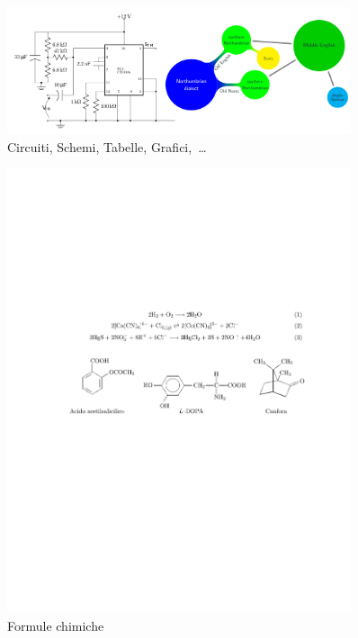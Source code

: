 \begin{figure}[!h]\centering
  \includegraphics[width=0.9\textwidth]{img/schemi}
  \caption{Circuiti, Schemi, Tabelle, Grafici,~\dots}
\end{figure}
\newpage\vspace{100px}
\begin{figure}[!h]\centering
  \includegraphics[width=0.9\textwidth]{img/chimica}
  \caption{Formule chimiche}
\end{figure}\vspace{100px}

